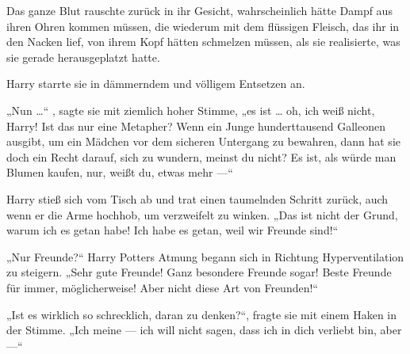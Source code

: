 Das ganze Blut rauschte zurück in ihr Gesicht, wahrscheinlich hätte Dampf aus ihren Ohren kommen müssen, die wiederum mit dem flüssigen Fleisch, das ihr in den Nacken lief, von ihrem Kopf hätten schmelzen müssen, als sie realisierte, was sie gerade herausgeplatzt hatte.

Harry starrte sie in dämmerndem und völligem Entsetzen an.

„Nun …“ , sagte sie mit ziemlich hoher Stimme, „es ist … oh, ich weiß nicht, Harry! Ist das nur eine Metapher? Wenn ein Junge hunderttausend Galleonen ausgibt, um ein Mädchen vor dem sicheren Untergang zu bewahren, dann hat sie doch ein Recht darauf, sich zu wundern, meinst du nicht? Es ist, als würde man Blumen kaufen, nur, weißt du, etwas mehr —“

Harry stieß sich vom Tisch ab und trat einen taumelnden Schritt zurück, auch wenn er die Arme hochhob, um verzweifelt zu winken.
„Das ist nicht der Grund, warum ich es getan habe! Ich habe es getan, weil wir Freunde sind!“

„Nur Freunde?“ Harry Potters Atmung begann sich in Richtung Hyperventilation zu steigern.
„Sehr gute Freunde! Ganz besondere Freunde sogar! Beste Freunde für immer, möglicherweise! Aber nicht diese Art von Freunden!“

„Ist es wirklich so schrecklich, daran zu denken?“, fragte sie mit einem Haken in der Stimme.
„Ich meine — ich will nicht sagen, dass ich in dich verliebt bin, aber —“

